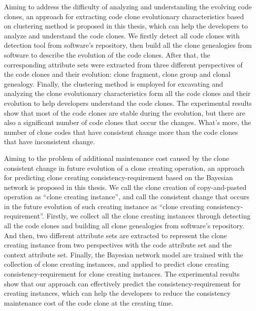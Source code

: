 {%
Aiming to address the difficulty of analyzing and understanding the evolving code clones, an  approach for extracting code clone evolutionary characteristics based on clustering method is proposed in this thesis, which can help the developers to analyze and understand the code clones. We firstly detect all code clones with detection tool from software's repository, then build all the clone genealogies from software to describe the evolution of the code clones. After that, the corresponding attribute sets were extracted from three different perspectives of the code clones and their evolution: clone fragment, clone group and clonal genealogy. Finally, the clustering method is employed for excavating and analyzing the clone evolutionary characteristics form all the code clones and their evolution to help developers understand the code clones. The experimental results show that most of the code clones are stable during the evolution, but there are also a significant number of code clones that occur the changes. What's more, the number of clone codes that have consistent change more than the code clones that have inconsistent change.

Aiming to the problem of additional maintenance cost caused by the clone consistent change in future evolution of a clone creating operation, an approach for predicting clone creating consistency-requirement based on the Bayesian network is proposed in this thesis. We call the clone creation of copy-and-pasted operation as ``clone creating instance'', and call the consistent change that occurs in the future evolution of such creating instance as ``clone creating consistency-requirement''. Firstly, we collect all the clone creating instances through detecting all the code clones and building all clone genealogies from software's repository. And then, two different attribute sets are extracted to represent the clone creating instance from two perspectives with the code attribute set and the context attribute set. Finally, the Bayesian network model are trained with the collection of clone creating instances, and applied to predict clone creating consistency-requirement for clone creating instances. The experimental results show that our approach can effectively predict the consistency-requirement for creating instances, which can help the developers to reduce the consistency maintenance cost of the code clone at the creating time.

}
